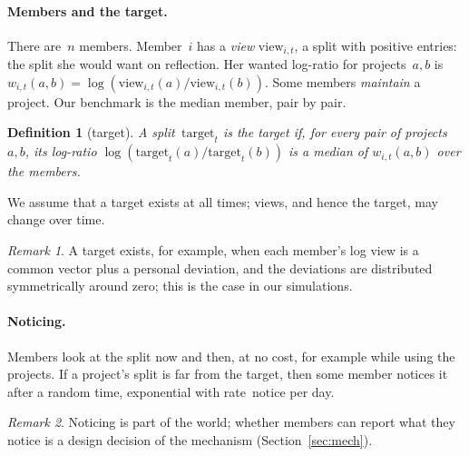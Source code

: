 \documentclass[doubleblind]{ecai}
\newtheorem{definition}{Definition}
\theoremstyle{remark}
\newtheorem{remark}{Remark}
\newcommand{\target}{\mathrm{target}}
\newcommand{\view}{\mathrm{view}}
\newcommand{\notice}{\mathrm{notice}}
\begin{document}
\paragraph{Members and the target.}
There are~$n$ members. Member~$i$ has a \emph{view} $\view_{i,t}$, a split with positive entries: the split she would want on reflection. Her wanted log-ratio for projects~$a,b$ is $w_{i,t}(a,b) = \log(\view_{i,t}(a)/\view_{i,t}(b))$. Some members \emph{maintain} a project. Our benchmark is the median member, pair by pair.

\begin{definition}[target]
A split~$\target_t$ is the \emph{target} if, for every pair of projects~$a,b$, its log-ratio $\log(\target_t(a)/\target_t(b))$ is a median of $w_{i,t}(a,b)$ over the members.
\end{definition}

We assume that a target exists at all times; views, and hence the target, may change over time.

\begin{remark}
A target exists, for example, when each member's log view is a common vector plus a personal deviation, and the deviations are distributed symmetrically around zero; this is the case in our simulations.
\end{remark}

\paragraph{Noticing.}
Members look at the split now and then, at no cost, for example while using the projects. If a project's split is far from the target, then some member notices it after a random time, exponential with rate~$\notice$ per day.

\begin{remark}
Noticing is part of the world; whether members can report what they notice is a design decision of the mechanism (Section~\ref{sec:mech}).
\end{remark}
\end{document}
